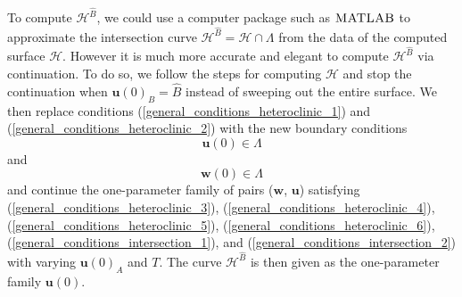\documentclass{ws-ijbc}
\begin{document}
To compute $\mathscr{H}^{\widehat{B}}$, we could use a computer package such as $\textsc{MATLAB}$ to approximate the intersection curve $\mathscr{H}^{\widehat{B}} = \mathscr{H} \cap \Lambda$ from the data of the computed surface $\mathscr{H}$.  However it is much more accurate and elegant to compute $\mathscr{H}^{\widehat{B}}$ via continuation.  To do so, we follow the steps for computing $\mathscr{H}$ and stop the continuation when $\mathbf{u}(0)_B = \widehat{B}$ instead of sweeping out the entire surface.  We then replace conditions (\ref{general_conditions_heteroclinic_1}) and (\ref{general_conditions_heteroclinic_2}) with the new boundary conditions
	\begin{equation}
		\mathbf{u}(0) \in \Lambda
		\label{general_conditions_intersection_1}
	\end{equation}
and
	\begin{equation}
		\mathbf{w}(0) \in \Lambda
		\label{general_conditions_intersection_2}
	\end{equation}	
and continue the one-parameter family of pairs ($\mathbf{w}$, $\mathbf{u}$) satisfying (\ref{general_conditions_heteroclinic_3}), (\ref{general_conditions_heteroclinic_4}), (\ref{general_conditions_heteroclinic_5}), (\ref{general_conditions_heteroclinic_6}), (\ref{general_conditions_intersection_1}), and (\ref{general_conditions_intersection_2}) with varying $\mathbf{u}(0)_A$ and $T$.  The curve $\mathscr{H}^{\widehat{B}}$ is then given as the one-parameter family $\mathbf{u}(0)$.
\end{document}
